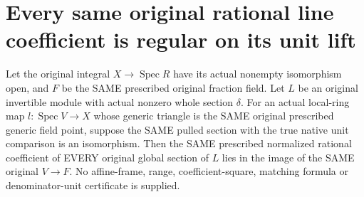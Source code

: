 \section{Every same original rational line coefficient is regular on its unit lift}
\label{sec:valuative-line-coefficient-regularity}

\begin{theorem}
\label{sc0-valuative-line-regularity:every-original-section}
\leanok
Let the original integral $X\to\operatorname{Spec}R$ have its
actual nonempty isomorphism open, and $F$ be the SAME prescribed
original fraction field. Let $L$ be an original invertible module
with actual nonzero whole section $\delta$. For an actual local-ring
map $l:\operatorname{Spec}V\to X$ whose generic triangle is the SAME
original prescribed generic field point, suppose the SAME pulled
section with the true native unit comparison is an isomorphism.
Then the SAME prescribed normalized rational coefficient of EVERY
original global section of $L$ lies in the image of the SAME
original $V\to F$. No affine-frame, range, coefficient-square,
matching formula or denominator-unit certificate is supplied.
\end{theorem}
